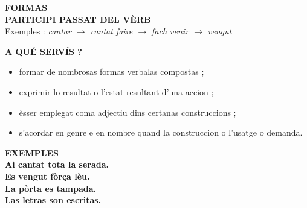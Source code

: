 \documentclass[a4paper,11pt]{article}
\begin{document}
\par\vspace{2.5mm}\noindent\begin{minipage}{.91\textwidth}
\begin{neutralbox}\textbf{\color{NeutralDark}FORMAS}\\[1mm]\centering
{\Large\textbf{PARTICIPI PASSAT DEL VÈRB}}\\[1mm]
\small Exemples : \textit{cantar $\rightarrow$ cantat \quad faire $\rightarrow$ fach \quad venir $\rightarrow$ vengut}
\end{neutralbox}
\vspace{2.5mm}\begin{center}\end{center}
\vspace{1.5mm}\begin{neutralbox}\textbf{\color{NeutralDark}A QUÉ SERVÍS ?}\\[1mm]
\begin{itemize}\setlength{\itemsep}{.4mm}
\item formar de nombrosas formas verbalas compostas ;
\item exprimir lo resultat o l'estat resultant d'una accion ;
\item èsser emplegat coma adjectiu dins certanas construccions ;
\item s'acordar en genre e en nombre quand la construccion o l'usatge o demanda.
\end{itemize}\end{neutralbox}
\vspace{2mm}\begin{neutralbox}\textbf{\color{NeutralDark}EXEMPLES}\\[1mm]
\textbf{Ai cantat tota la serada.}\\
\textbf{Es vengut fòrça lèu.}\\
\textbf{La pòrta es tampada.}\\
\textbf{Las letras son escritas.}
\end{neutralbox}

\end{minipage}
\end{document}
